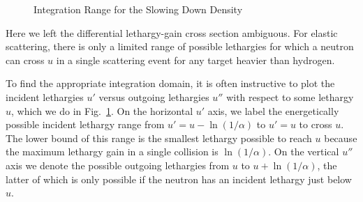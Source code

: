\begin{figure}[tb!]
\begin{center}
\begin{center}
\end{center}
\caption{Integration Range for the Slowing Down Density}
\label{Fig:thermalization_slowingDownDensityRange}
\end{center}
\end{figure}

Here we left the differential lethargy-gain cross section ambiguous. For elastic scattering, there is only a limited range of possible lethargies for which a neutron can cross $u$ in a single scattering event for any target heavier than hydrogen. 

To find the appropriate integration domain, it is often instructive to plot the incident lethargies $u'$ versus outgoing lethargies $u''$ with respect to some lethargy $u$, which we do in Fig.~\ref{Fig:thermalization_slowingDownDensityRange}. On the horizontal $u'$ axis, we label the energetically possible incident lethargy range from $u' = u - \ln(1/\alpha)$ to $u' = u$ to cross $u$. The lower bound of this range is the smallest lethargy possible to reach $u$ because the maximum lethargy gain in a single collision is $\ln(1/\alpha)$. On the vertical $u''$ axis we denote the possible outgoing lethargies from $u$ to $u + \ln(1/\alpha)$, the latter of which is only possible if the neutron has an incident lethargy just below $u$.


